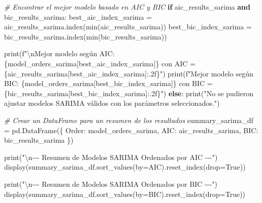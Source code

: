 \documentclass[
  11pt,
]{article}
\newenvironment{Shaded}{}{}
\newcommand{\BuiltInTok}[1]{\textcolor[rgb]{0.00,0.50,0.00}{#1}}
\newcommand{\CharTok}[1]{\textcolor[rgb]{0.25,0.44,0.63}{#1}}
\newcommand{\CommentTok}[1]{\textcolor[rgb]{0.38,0.63,0.69}{\textit{#1}}}
\newcommand{\ControlFlowTok}[1]{\textcolor[rgb]{0.00,0.44,0.13}{\textbf{#1}}}
\newcommand{\KeywordTok}[1]{\textcolor[rgb]{0.00,0.44,0.13}{\textbf{#1}}}
\newcommand{\NormalTok}[1]{#1}
\newcommand{\OperatorTok}[1]{\textcolor[rgb]{0.40,0.40,0.40}{#1}}
\newcommand{\SpecialCharTok}[1]{\textcolor[rgb]{0.25,0.44,0.63}{#1}}
\newcommand{\SpecialStringTok}[1]{\textcolor[rgb]{0.73,0.40,0.53}{#1}}
\newcommand{\StringTok}[1]{\textcolor[rgb]{0.25,0.44,0.63}{#1}}
\newcommand{\VariableTok}[1]{\textcolor[rgb]{0.10,0.09,0.49}{#1}}
\begin{document}
\begin{Shaded}
\begin{Highlighting}[]
\CommentTok{\# Encontrar el mejor modelo basado en AIC y BIC}
\ControlFlowTok{if}\NormalTok{ aic\_results\_sarima }\KeywordTok{and}\NormalTok{ bic\_results\_sarima:}
\NormalTok{    best\_aic\_index\_sarima }\OperatorTok{=}\NormalTok{ aic\_results\_sarima.index(}\BuiltInTok{min}\NormalTok{(aic\_results\_sarima))}
\NormalTok{    best\_bic\_index\_sarima }\OperatorTok{=}\NormalTok{ bic\_results\_sarima.index(}\BuiltInTok{min}\NormalTok{(bic\_results\_sarima))}

    \BuiltInTok{print}\NormalTok{(}\SpecialStringTok{f"}\CharTok{\textbackslash{}n}\SpecialStringTok{Mejor modelo según AIC: }\SpecialCharTok{\{}\NormalTok{model\_orders\_sarima[best\_aic\_index\_sarima]}\SpecialCharTok{\}}\SpecialStringTok{ con AIC = }\SpecialCharTok{\{}\NormalTok{aic\_results\_sarima[best\_aic\_index\_sarima]}\SpecialCharTok{:.2f\}}\SpecialStringTok{"}\NormalTok{)}
    \BuiltInTok{print}\NormalTok{(}\SpecialStringTok{f"Mejor modelo según BIC: }\SpecialCharTok{\{}\NormalTok{model\_orders\_sarima[best\_bic\_index\_sarima]}\SpecialCharTok{\}}\SpecialStringTok{ con BIC = }\SpecialCharTok{\{}\NormalTok{bic\_results\_sarima[best\_bic\_index\_sarima]}\SpecialCharTok{:.2f\}}\SpecialStringTok{"}\NormalTok{)}
\ControlFlowTok{else}\NormalTok{:}
    \BuiltInTok{print}\NormalTok{(}\StringTok{"No se pudieron ajustar modelos SARIMA válidos con los parámetros seleccionados."}\NormalTok{)}

\CommentTok{\# Crear un DataFrame para un resumen de los resultados}
\NormalTok{summary\_sarima\_df }\OperatorTok{=}\NormalTok{ pd.DataFrame(\{}
    \StringTok{\textquotesingle{}Order\textquotesingle{}}\NormalTok{: model\_orders\_sarima,}
    \StringTok{\textquotesingle{}AIC\textquotesingle{}}\NormalTok{: aic\_results\_sarima,}
    \StringTok{\textquotesingle{}BIC\textquotesingle{}}\NormalTok{: bic\_results\_sarima}
\NormalTok{\})}

\BuiltInTok{print}\NormalTok{(}\StringTok{"}\CharTok{\textbackslash{}n}\StringTok{{-}{-}{-} Resumen de Modelos SARIMA Ordenados por AIC {-}{-}{-}"}\NormalTok{)}
\NormalTok{display(summary\_sarima\_df.sort\_values(by}\OperatorTok{=}\StringTok{\textquotesingle{}AIC\textquotesingle{}}\NormalTok{).reset\_index(drop}\OperatorTok{=}\VariableTok{True}\NormalTok{))}

\BuiltInTok{print}\NormalTok{(}\StringTok{"}\CharTok{\textbackslash{}n}\StringTok{{-}{-}{-} Resumen de Modelos SARIMA Ordenados por BIC {-}{-}{-}"}\NormalTok{)}
\NormalTok{display(summary\_sarima\_df.sort\_values(by}\OperatorTok{=}\StringTok{\textquotesingle{}BIC\textquotesingle{}}\NormalTok{).reset\_index(drop}\OperatorTok{=}\VariableTok{True}\NormalTok{))}
\end{Highlighting}
\end{Shaded}
\end{document}
